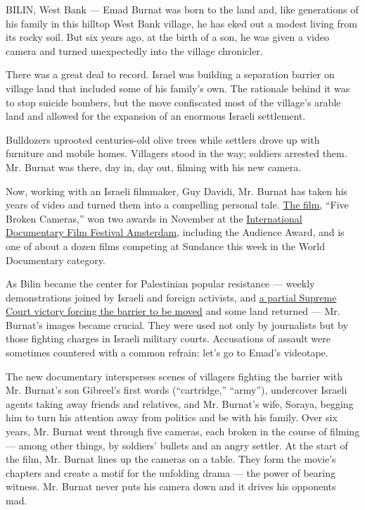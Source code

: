 BILIN, West Bank --- Emad Burnat was born to the land and, like
generations of his family in this hilltop West Bank village, he has eked
out a modest living from its rocky soil. But six years ago, at the birth
of a son, he was given a video camera and turned unexpectedly into the
village chronicler.

There was a great deal to record. Israel was building a separation
barrier on village land that included some of his family's own. The
rationale behind it was to stop suicide bombers, but the move
confiscated most of the village's arable land and allowed for the
expansion of an enormous Israeli settlement.

Bulldozers uprooted centuries-old olive trees while settlers drove up
with furniture and mobile homes. Villagers stood in the way; soldiers
arrested them. Mr. Burnat was there, day in, day out, filming with his
new camera.

Now, working with an Israeli filmmaker, Guy Davidi, Mr. Burnat has taken
his years of video and turned them into a compelling personal tale.
\href{http://www.idfa.nl/industry/tags/project.aspx?ID=3c05550a-e5e2-4ef4-83ce-78e101bd811e}{The
film}, ``Five Broken Cameras,'' won two awards in November at the
\href{http://www.idfa.nl/nl.aspx}{International Documentary Film
Festival Amsterdam}, including the Audience Award, and is one of about a
dozen films competing at Sundance this week in the World Documentary
category.

As Bilin became the center for Palestinian popular resistance --- weekly
demonstrations joined by Israeli and foreign activists, and
\href{http://www.nytimes.com/2011/06/25/world/middleeast/25palestinians.html}{a
partial Supreme Court victory forcing the barrier to be moved} and some
land returned --- Mr. Burnat's images became crucial. They were used not
only by journalists but by those fighting charges in Israeli military
courts. Accusations of assault were sometimes countered with a common
refrain: let's go to Emad's videotape.

The new documentary intersperses scenes of villagers fighting the
barrier with Mr. Burnat's son Gibreel's first words (``cartridge,''
``army''), undercover Israeli agents taking away friends and relatives,
and Mr. Burnat's wife, Soraya, begging him to turn his attention away
from politics and be with his family. Over six years, Mr. Burnat went
through five cameras, each broken in the course of filming --- among
other things, by soldiers' bullets and an angry settler. At the start of
the film, Mr. Burnat lines up the cameras on a table. They form the
movie's chapters and create a motif for the unfolding drama --- the
power of bearing witness. Mr. Burnat never puts his camera down and it
drives his opponents mad.

